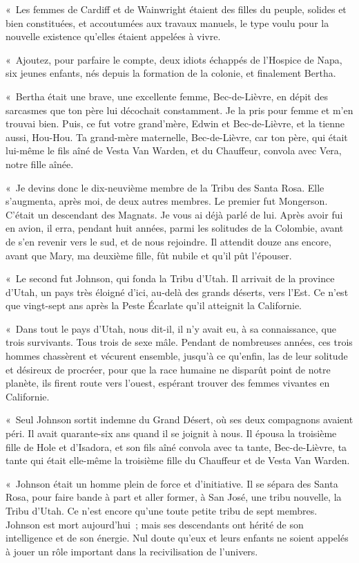 \documentclass[french,twoside]{book} %
\begin{document}
« Les femmes de Cardiff et de Wainwright étaient des filles du peuple, solides et bien constituées, et accoutumées aux travaux manuels, le type voulu pour la nouvelle existence qu’elles étaient appelées à vivre.\par
« Ajoutez, pour parfaire le compte, deux idiots échappés de l’Hospice de Napa, six jeunes enfants, nés depuis la formation de la colonie, et finalement Bertha.\par
« Bertha était une brave, une excellente femme, Bec-de-Lièvre, en dépit des sarcasmes que ton père lui décochait constamment. Je la pris pour femme et m’en trouvai bien. Puis, ce fut votre grand’mère, Edwin et Bec-de-Lièvre, et la tienne aussi, Hou-Hou. Ta grand-mère maternelle, Bec-de-Lièvre, car ton père, qui était lui-même le fils aîné de Vesta Van Warden, et du Chauffeur, convola avec Vera, notre fille aînée.\par
« Je devins donc le dix-neuvième membre de la Tribu des Santa Rosa. Elle s’augmenta, après moi, de deux autres membres. Le premier fut Mongerson. C’était un descendant des Magnats. Je vous ai déjà parlé de lui. Après avoir fui en avion, il erra, pendant huit années, parmi les solitudes de la Colombie, avant de s’en revenir vers le sud, et de nous rejoindre. Il attendit douze ans encore, avant que Mary, ma deuxième fille, fût nubile et qu’il pût l’épouser.\par
« Le second fut Johnson, qui fonda la Tribu d’Utah. Il arrivait de la province d’Utah, un pays très éloigné d’ici, au-delà des grands déserts, vers l’Est. Ce n’est que vingt-sept ans après la Peste Écarlate qu’il atteignit la Californie.\par
« Dans tout le pays d’Utah, nous dit-il, il n’y avait eu, à sa connaissance, que trois survivants. Tous trois de sexe mâle. Pendant de nombreuses années, ces trois hommes chassèrent et vécurent ensemble, jusqu’à ce qu’enfin, las de leur solitude et désireux de procréer, pour que la race humaine ne disparût point de notre planète, ils firent route vers l’ouest, espérant trouver des femmes vivantes en Californie.\par
« Seul Johnson sortit indemne du Grand Désert, où ses deux compagnons avaient péri. Il avait quarante-six ans quand il se joignit à nous. Il épousa la troisième fille de Hole et d’Isadora, et son fils aîné convola avec ta tante, Bec-de-Lièvre, ta tante qui était elle-même la troisième fille du Chauffeur et de Vesta Van Warden.\par
« Johnson était un homme plein de force et d’initiative. Il se sépara des Santa Rosa, pour faire bande à part et aller former, à San José, une tribu nouvelle, la Tribu d’Utah. Ce n’est encore qu’une toute petite tribu de sept membres. Johnson est mort aujourd’hui ; mais ses descendants ont hérité de son intelligence et de son énergie. Nul doute qu’eux et leurs enfants ne soient appelés à jouer un rôle important dans la recivilisation de l’univers.\par
\end{document}

